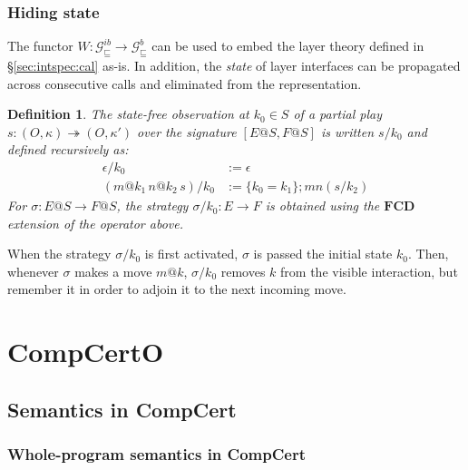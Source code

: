 \documentclass[draft,11pt]{report}
\newtheorem{definition}{Definition}
\newcommand{\gcat}{\mathcal{G}_{\sqsubseteq}}
\begin{document}

\section{Hiding state} \label{sec:gamesem:pack} %

The functor
$W : \gcat^{ib} \rightarrow \gcat^b$
can be used to embed the layer theory
defined in \S\ref{sec:intspec:cal} as-is.
In addition, the \emph{state} of layer interfaces
can be propagated across consecutive calls and
eliminated from the representation.

\begin{definition}
The \emph{state-free observation} at $k_0 \in S$
of a partial play
$s : (O, \kappa) \twoheadrightarrow (O, \kappa')$
over the signature $[E@S, F@S]$
is written $s/k_0$ and defined recursively as:
\begin{align*}
    \epsilon / k_0 &:= \epsilon \\
    (m@k_1 \, n@k_2 \, s) / k_0 &:=
      \{ k_0 = k_1 \} ; m n (s / k_2)
\end{align*}
For $\sigma : E@S \rightarrow F@S$,
the strategy $\sigma / k_0 : E \rightarrow F$
is obtained using the $\mathbf{FCD}$ extension
of the operator above.
\end{definition}

When the strategy $\sigma / k_0$ is first activated,
$\sigma$ is passed the initial state $k_0$.
Then, whenever $\sigma$ makes a move $m@k$,
$\sigma / k_0$ removes $k$ from the visible interaction,
but remember it in order to adjoin it to the next incoming move.



\part{CompCertO}

\chapter{Semantics in CompCert} \label{sec:compcert-sem} %

\section{Whole-program semantics in CompCert} \label{sec:sem:closed} %
\end{document}

